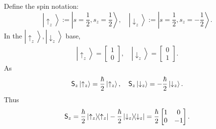 \documentclass{article}
\def\u{\uparrow}\def\v{\downarrow}
\newcommand{\ko}[1]{\hspace{-#1 pt}}%
\newcommand{\ket}[1]{\left\vert #1\right\rangle}
\newcommand{\ktbr}[2]{\left\vert#1\right\rangle\ko3\left\langle#2\right\vert}
\begin{document}
\noindent Define the spin notation:
$$\ket{\u_z}:=\ket{s=\textstyle\frac12,s_z=\frac12},\quad\ket{\v_z}:=\ket{s=\textstyle\frac12,s_z=-\frac12}.$$
In the $\ket{\u_z},\ket{\v_z}$ base,
\begin{align*}
	\ket{\u_z}=\begin{bmatrix}1\\0\end{bmatrix},\quad
	\ket{\v_z}=\begin{bmatrix}0\\1\end{bmatrix}.
\end{align*}
As
$$\sS_z\ket{\u_z}=\frac{\hbar}2\ket{\u_z},\quad\sS_z\ket{\v_z}=-\frac{\hbar}2\ket{\v_z}.$$
Thus
\begin{align*}
	\sS_z=\frac{\hbar}2\ktbr{\u_z}{\u_z}-\frac{\hbar}2\ktbr{\v_z}{\v_z}=\displaystyle\frac{\hbar}2\begin{bmatrix}1&0\\0&-1\end{bmatrix}.
\end{align*}
\end{document}

